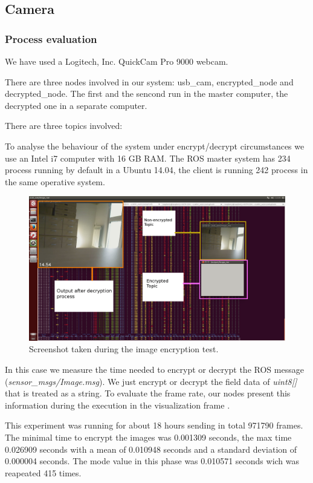 \documentclass[journal,twoside]{JoPhA}
\begin{document}
\subsection{Camera}

\subsubsection{Process evaluation}

We have used a Logitech, Inc. QuickCam Pro 9000 webcam.

There are three nodes involved in our system: usb\_cam, encrypted\_node and decrypted\_node. The first and the sencond run in the master computer, the decrypted one in a separate computer.

There are three topics involved: 

To analyse the behaviour of the system under encrypt/decrypt circumstances we use an Intel i7 computer with 16 GB RAM. The ROS master system has 234 process running by default in a Ubuntu 14.04, the client is running 242 process in the same operative system.

\begin{figure}[ht]
    \centering
    \includegraphics[width=.5\textwidth]{Screenshot.png}
    \caption{Screenshot taken during the image encryption test.}
  \label{fig:screenshot}
\end{figure}

In this case we measure the time needed to encrypt or decrypt the ROS message ({\em sensor\_msgs/Image.msg}). We just encrypt or decrypt the field data of {\em uint8[]} that is treated as a string.
To evaluate  the frame rate, our nodes present this information during the execution in the visualization frame . 

This experiment was running for about 18 hours sending in total 971790 frames. The minimal time to encrypt the images was 0.001309 seconds, the max time  0.026909 seconds with a 
mean of  0.010948 seconds and a standard deviation of 0.000004 seconds. The mode value in this phase was 0.010571 seconds wich was reapeated 415 times. 
\end{document}
